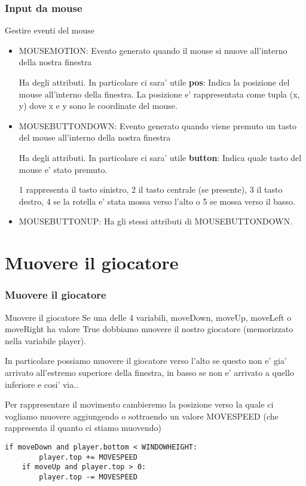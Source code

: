 \documentclass{beamer}
\begin{document}
\begin{frame}[fragile]
\frametitle{Input da mouse}
    
    \begin{block}{Gestire eventi del mouse}
        \begin{itemize}
            \item MOUSEMOTION: Evento generato quando il mouse si muove all'interno della nostra finestra
            
            Ha degli attributi. In particolare ci sara' utile \textbf{pos}: Indica la posizione del mouse all'interno della finestra. La posizione e' rappresentata come tupla (x, y) dove x e y sono le coordinate del mouse.
            \item MOUSEBUTTONDOWN: Evento generato quando viene premuto un tasto del mouse all'interno della nostra finestra
            
            Ha degli attributi. In particolare ci sara' utile \textbf{button}: Indica quale tasto del mouse e' stato premuto.
            
            1 rappresenta il tasto sinistro, 2 il tasto centrale (se presente), 3 il tasto destro, 4 se la rotella e' stata mossa verso l'alto o 5 se mossa verso il basso.
            
            \item MOUSEBUTTONUP: Ha gli stessi attributi di MOUSEBUTTONDOWN.
        \end{itemize}
    \end{block}
    
\end{frame}

\section{Muovere il giocatore}

\begin{frame}[fragile]
\frametitle{Muovere il giocatore}

\begin{block}{Muovere il giocatore}
Se una delle 4 variabili, moveDown, moveUp, moveLeft o moveRight ha valore True dobbiamo muovere il nostro giocatore (memorizzato nella variabile player).

In particolare possiamo muovere il giocatore verso l'alto se questo non e' gia' arrivato all'estremo superiore della finestra, in basso se non e' arrivato a quello inferiore e cosi' via..

Per rappresentare il movimento cambieremo la posizione verso la quale ci vogliamo muovere aggiungendo o sottraendo un valore MOVESPEED (che rappresenta il quanto ci stiamo muovendo)
\end{block}

\begin{lstlisting}
if moveDown and player.bottom < WINDOWHEIGHT:
        player.top += MOVESPEED
    if moveUp and player.top > 0:
        player.top -= MOVESPEED
\end{lstlisting}
\end{frame}
\end{document}
